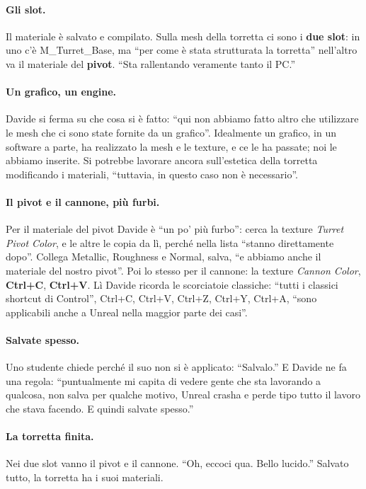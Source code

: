 \paragraph{Gli slot.} Il materiale è salvato e compilato. Sulla mesh della torretta ci
sono i \textbf{due slot}: in uno c'è M\_Turret\_Base, ma ``per come è stata strutturata
la torretta'' nell'altro va il materiale del \textbf{pivot}. ``Sta rallentando
veramente tanto il PC.''

\paragraph{Un grafico, un engine.} Davide si ferma su che cosa si è fatto: ``qui non
abbiamo fatto altro che utilizzare le mesh che ci sono state fornite da un grafico''.
Idealmente un grafico, in un software a parte, ha realizzato la mesh e le texture, e ce
le ha passate; noi le abbiamo inserite. Si potrebbe lavorare ancora sull'estetica della
torretta modificando i materiali, ``tuttavia, in questo caso non è necessario''.

\paragraph{Il pivot e il cannone, più furbi.} Per il materiale del pivot Davide è ``un
po' più furbo'': cerca la texture \emph{Turret Pivot Color}, e le altre le copia da lì,
perché nella lista ``stanno direttamente dopo''. Collega Metallic, Roughness e Normal,
salva, ``e abbiamo anche il materiale del nostro pivot''. Poi lo stesso per il cannone:
la texture \emph{Cannon Color}, \textbf{Ctrl+C}, \textbf{Ctrl+V}. Lì Davide ricorda le
scorciatoie classiche: ``tutti i classici shortcut di Control'', Ctrl+C, Ctrl+V, Ctrl+Z,
Ctrl+Y, Ctrl+A, ``sono applicabili anche a Unreal nella maggior parte dei casi''.

\paragraph{Salvate spesso.} Uno studente chiede perché il suo non si è applicato:
``Salvalo.'' E Davide ne fa una regola: ``puntualmente mi capita di vedere gente che sta
lavorando a qualcosa, non salva per qualche motivo, Unreal crasha e perde tipo tutto il
lavoro che stava facendo. E quindi salvate spesso.''

\paragraph{La torretta finita.} Nei due slot vanno il pivot e il cannone. ``Oh, eccoci
qua. Bello lucido.'' Salvato tutto, la torretta ha i suoi materiali.

